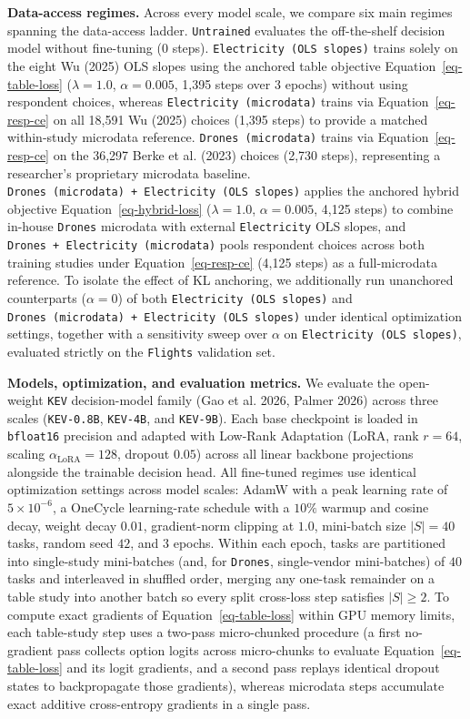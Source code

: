 \documentclass[
  11pt,
  letterpaper,
]{article}
\begin{document}
\textbf{Data-access regimes.} Across every model scale, we compare six
main regimes spanning the data-access ladder. \texttt{Untrained}
evaluates the off-the-shelf decision model without fine-tuning (\(0\)
steps). \texttt{Electricity\ (OLS\ slopes)} trains solely on the eight
Wu (2025) OLS slopes using the anchored table objective
Equation~\ref{eq-table-loss} (\(\lambda = 1.0\), \(\alpha = 0.005\),
1,395 steps over \(3\) epochs) without using respondent choices, whereas
\texttt{Electricity\ (microdata)} trains via Equation~\ref{eq-resp-ce}
on all 18,591 Wu (2025) choices (1,395 steps) to provide a matched
within-study microdata reference. \texttt{Drones\ (microdata)} trains
via Equation~\ref{eq-resp-ce} on the 36,297 Berke et al. (2023) choices
(2,730 steps), representing a researcher's proprietary microdata
baseline. \texttt{Drones\ (microdata)\ +\ Electricity\ (OLS\ slopes)}
applies the anchored hybrid objective Equation~\ref{eq-hybrid-loss}
(\(\lambda = 1.0\), \(\alpha = 0.005\), 4,125 steps) to combine in-house
\texttt{Drones} microdata with external \texttt{Electricity} OLS slopes,
and \texttt{Drones\ +\ Electricity\ (microdata)} pools respondent
choices across both training studies under Equation~\ref{eq-resp-ce}
(4,125 steps) as a full-microdata reference. To isolate the effect of KL
anchoring, we additionally run unanchored counterparts (\(\alpha = 0\))
of both \texttt{Electricity\ (OLS\ slopes)} and
\texttt{Drones\ (microdata)\ +\ Electricity\ (OLS\ slopes)} under
identical optimization settings, together with a sensitivity sweep over
\(\alpha\) on \texttt{Electricity\ (OLS\ slopes)}, evaluated strictly on
the \texttt{Flights} validation set.

\textbf{Models, optimization, and evaluation metrics.} We evaluate the
open-weight \texttt{KEV} decision-model family (Gao et al. 2026, Palmer
2026) across three scales (\texttt{KEV-0.8B}, \texttt{KEV-4B}, and
\texttt{KEV-9B}). Each base checkpoint is loaded in \texttt{bfloat16}
precision and adapted with Low-Rank Adaptation (LoRA, rank \(r = 64\),
scaling \(\alpha_{\mathrm{LoRA}} = 128\), dropout \(0.05\)) across all
linear backbone projections alongside the trainable decision head. All
fine-tuned regimes use identical optimization settings across model
scales: AdamW with a peak learning rate of \(5 \times 10^{-6}\), a
OneCycle learning-rate schedule with a \(10\%\) warmup and cosine decay,
weight decay \(0.01\), gradient-norm clipping at \(1.0\), mini-batch
size \(|S| = 40\) tasks, random seed \(42\), and \(3\) epochs. Within
each epoch, tasks are partitioned into single-study mini-batches (and,
for \texttt{Drones}, single-vendor mini-batches) of \(40\) tasks and
interleaved in shuffled order, merging any one-task remainder on a table
study into another batch so every split cross-loss step satisfies
\(|S| \ge 2\). To compute exact gradients of
Equation~\ref{eq-table-loss} within GPU memory limits, each table-study
step uses a two-pass micro-chunked procedure (a first no-gradient pass
collects option logits across micro-chunks to evaluate
Equation~\ref{eq-table-loss} and its logit gradients, and a second pass
replays identical dropout states to backpropagate those gradients),
whereas microdata steps accumulate exact additive cross-entropy
gradients in a single pass.
\end{document}
